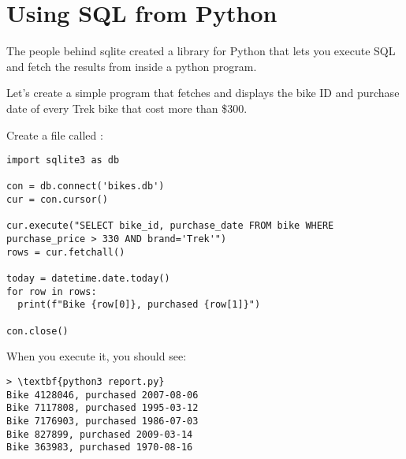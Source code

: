 \section{Using SQL from Python}

The people behind sqlite created a library for Python that lets you
execute SQL and fetch the results from inside a python program.

Let's create a simple program that fetches and displays the bike ID
and purchase date of every Trek bike that cost more than \$300.

Create a file called :
\begin{Verbatim}
import sqlite3 as db

con = db.connect('bikes.db')
cur = con.cursor()

cur.execute("SELECT bike_id, purchase_date FROM bike WHERE purchase_price > 330 AND brand='Trek'")
rows = cur.fetchall()

today = datetime.date.today()
for row in rows:
  print(f"Bike {row[0]}, purchased {row[1]}")

con.close()
\end{Verbatim}

When you execute it, you should see:
\begin{Verbatim}[commandchars=\\\{\}]
> \textbf{python3 report.py}
Bike 4128046, purchased 2007-08-06
Bike 7117808, purchased 1995-03-12
Bike 7176903, purchased 1986-07-03
Bike 827899, purchased 2009-03-14
Bike 363983, purchased 1970-08-16
\end{Verbatim}
